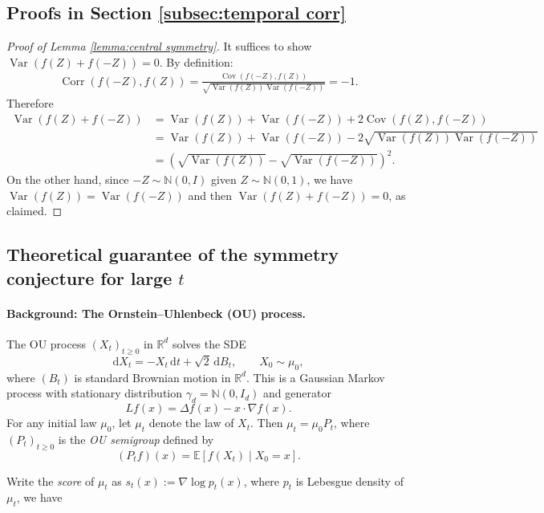 \documentclass[12pt]{article}
\newcommand{\0}{\mathbf{0}}
\newcommand{\bN}{\mathbb{N}}
\DeclareMathOperator{\Cov}{Cov}
\DeclareMathOperator{\Corr}{Corr}
\DeclareMathOperator{\Var}{Var}
\newcommand{\R}{\mathbb{R}}
\newcommand{\E}{\mathbb{E}}
\begin{document}
\subsection{Proofs in Section \ref{subsec:temporal corr}}\label{subsec: proof temporal corr}
\begin{proof}[Proof of Lemma \ref{lemma:central symmetry}]
    It suffices to show $\Var(f(Z) + f(-Z)) = 0$. By definition:
    \begin{align*}
        \Corr(f(-Z), f(Z)) = \frac{\Cov(f(-Z), f(Z))}{\sqrt{\Var(f(Z))\Var(f(-Z))}} = -1.
    \end{align*}
    Therefore
    \begin{align*}
        \Var(f(Z) + f(-Z)) &= \Var(f(Z)) + \Var(f(-Z)) + 2\Cov(f(Z), f(-Z))\\
        & = \Var(f(Z)) + \Var(f(-Z)) - 2\sqrt{\Var(f(Z))\Var(f(-Z))}\\
        & = \left(\sqrt{\Var(f(Z))} - \sqrt{\Var(f(-Z))}\right)^2.
    \end{align*}
On the other hand, since $-Z\sim \bN(0,I)$ given $Z\sim \bN(0,1)$, we have $\Var(f(Z)) = \Var(f(-Z))$ and then $\Var(f(Z) + f(-Z)) = 0$, as claimed.
\end{proof}



\subsection{Theoretical guarantee of the symmetry conjecture for large $t$}\label{subsec: conjecture proof large t}
\paragraph{Background: The Ornstein--Uhlenbeck (OU) process.}
The OU process $(X_t)_{t\ge0}$ in $\R^d$ solves the SDE
\[
\mathrm{d}X_t = -X_t\,\mathrm{d}t + \sqrt{2}\,\mathrm{d}B_t, \qquad X_0\sim\mu_0,
\]
where $(B_t)$ is standard Brownian motion in $\R^d$.
This is a Gaussian Markov process with stationary distribution
$\gamma_d=\mathbb N(0,I_d)$ and generator
\[
Lf(x) = \Delta f(x) - x\cdot\nabla f(x).
\]
For any initial law $\mu_0$, let $\mu_t$ denote the law of $X_t$. Then $\mu_t=\mu_0 P_t$,
where $(P_t)_{t\ge0}$ is the \emph{OU semigroup} defined by
\[
(P_t f)(x) = \E[f(X_t)\mid X_0=x].
\]



Write the \emph{score} of $\mu_t$ as $s_t(x):=\nabla\log p_t(x)$, where $p_t$ is Lebesgue density of $\mu_t$,  we have
\end{document}
